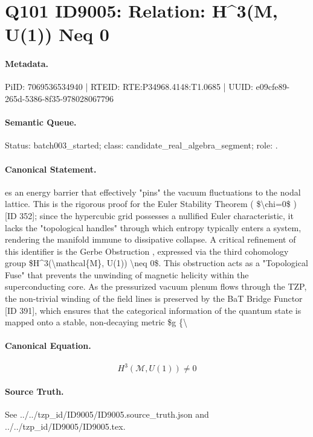 \section*{Q101 ID9005: Relation: H\textasciicircum{}3(M, U(1)) Neq 0}
\paragraph{Metadata.}
PiID: 7069536534940 | RTEID: RTE:P34968.4148:T1.0685 | UUID: e09cfe89-265d-5386-8f35-978028067796

\paragraph{Semantic Queue.}
Status: batch003\_started; class: candidate\_real\_algebra\_segment; role: .

\paragraph{Canonical Statement.}
es an energy barrier that effectively "pins" the vacuum fluctuations to the nodal lattice. This is the rigorous proof for the Euler Stability Theorem ( \$\textbackslash{}chi=0\$ ) [ID 352]; since the hypercubic grid possesses a nullified Euler characteristic, it lacks the "topological handles" through which entropy typically enters a system, rendering the manifold immune to dissipative collapse. A critical refinement of this identifier is the Gerbe Obstruction , expressed via the third cohomology group \$H\textasciicircum{}3(\textbackslash{}mathcal\{M\}, U(1)) \textbackslash{}neq 0\$. This obstruction acts as a "Topological Fuse" that prevents the unwinding of magnetic helicity within the superconducting core. As the pressurized vacuum plenum flows through the TZP, the non-trivial winding of the field lines is preserved by the BaT Bridge Functor [ID 391], which ensures that the categorical information of the quantum state is mapped onto a stable, non-decaying metric \$g \{\textbackslash{}

\paragraph{Canonical Equation.}
\[
H^3(\mathcal{M}, U(1)) \neq 0
\]

\paragraph{Source Truth.}
See ../../tzp\_id/ID9005/ID9005.source\_truth.json and ../../tzp\_id/ID9005/ID9005.tex.
